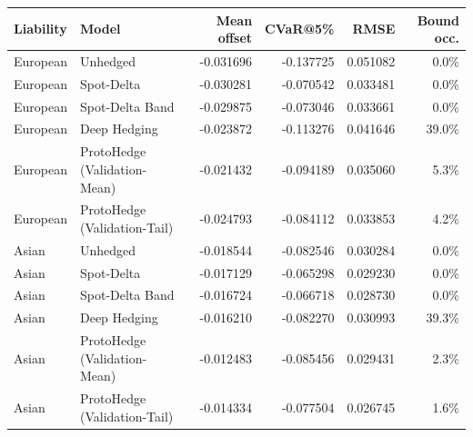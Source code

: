 \begin{tabular}{llrrrr}
\toprule
Liability & Model & Mean offset & CVaR@5\% & RMSE & Bound occ. \\
\midrule
European & Unhedged & -0.031696 & -0.137725 & 0.051082 & 0.0\% \\
European & Spot-Delta & -0.030281 & -0.070542 & 0.033481 & 0.0\% \\
European & Spot-Delta Band & -0.029875 & -0.073046 & 0.033661 & 0.0\% \\
European & Deep Hedging & -0.023872 & -0.113276 & 0.041646 & 39.0\% \\
European & ProtoHedge (Validation-Mean) & -0.021432 & -0.094189 & 0.035060 & 5.3\% \\
European & ProtoHedge (Validation-Tail) & -0.024793 & -0.084112 & 0.033853 & 4.2\% \\
Asian & Unhedged & -0.018544 & -0.082546 & 0.030284 & 0.0\% \\
Asian & Spot-Delta & -0.017129 & -0.065298 & 0.029230 & 0.0\% \\
Asian & Spot-Delta Band & -0.016724 & -0.066718 & 0.028730 & 0.0\% \\
Asian & Deep Hedging & -0.016210 & -0.082270 & 0.030993 & 39.3\% \\
Asian & ProtoHedge (Validation-Mean) & -0.012483 & -0.085456 & 0.029431 & 2.3\% \\
Asian & ProtoHedge (Validation-Tail) & -0.014334 & -0.077504 & 0.026745 & 1.6\% \\
\bottomrule
\end{tabular}
